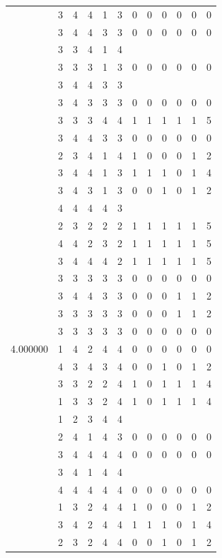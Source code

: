 \documentclass[]{book}
\theoremstyle{definition}
\theoremstyle{definition}
\theoremstyle{definition}
\theoremstyle{remark}
\begin{document}
\begin{table}
{\begin{tabular}[t]{rrrrrrrrrrrr}
 & 3 & 4 & 4 & 1 & 3 & 0 & 0 & 0 & 0 & 0 & 0\\
 & 3 & 4 & 4 & 3 & 3 & 0 & 0 & 0 & 0 & 0 & 0\\
 & 3 & 3 & 4 & 1 & 4 &  &  &  &  &  & \\
 & 3 & 3 & 3 & 1 & 3 & 0 & 0 & 0 & 0 & 0 & 0\\
 & 3 & 4 & 4 & 3 & 3 &  &  &  &  &  & \\
 & 3 & 4 & 3 & 3 & 3 & 0 & 0 & 0 & 0 & 0 & 0\\
 & 3 & 3 & 3 & 4 & 4 & 1 & 1 & 1 & 1 & 1 & 5\\
 & 3 & 4 & 4 & 3 & 3 & 0 & 0 & 0 & 0 & 0 & 0\\
 & 2 & 3 & 4 & 1 & 4 & 1 & 0 & 0 & 0 & 1 & 2\\
 & 3 & 4 & 4 & 1 & 3 & 1 & 1 & 1 & 0 & 1 & 4\\
 & 3 & 4 & 3 & 1 & 3 & 0 & 0 & 1 & 0 & 1 & 2\\
 & 4 & 4 & 4 & 4 & 3 &  &  &  &  &  & \\
 & 2 & 3 & 2 & 2 & 2 & 1 & 1 & 1 & 1 & 1 & 5\\
 & 4 & 4 & 2 & 3 & 2 & 1 & 1 & 1 & 1 & 1 & 5\\
 & 3 & 4 & 4 & 4 & 2 & 1 & 1 & 1 & 1 & 1 & 5\\
 & 3 & 3 & 3 & 3 & 3 & 0 & 0 & 0 & 0 & 0 & 0\\
 & 3 & 4 & 4 & 3 & 3 & 0 & 0 & 0 & 1 & 1 & 2\\
 & 3 & 3 & 3 & 3 & 3 & 0 & 0 & 0 & 1 & 1 & 2\\
 & 3 & 3 & 3 & 3 & 3 & 0 & 0 & 0 & 0 & 0 & 0\\
4.000000 & 1 & 4 & 2 & 4 & 4 & 0 & 0 & 0 & 0 & 0 & 0\\
 & 4 & 3 & 4 & 3 & 4 & 0 & 0 & 1 & 0 & 1 & 2\\
 & 3 & 3 & 2 & 2 & 4 & 1 & 0 & 1 & 1 & 1 & 4\\
 & 1 & 3 & 3 & 2 & 4 & 1 & 0 & 1 & 1 & 1 & 4\\
 & 1 & 2 & 3 & 4 & 4 &  &  &  &  &  & \\
 & 2 & 4 & 1 & 4 & 3 & 0 & 0 & 0 & 0 & 0 & 0\\
 & 3 & 4 & 4 & 4 & 4 & 0 & 0 & 0 & 0 & 0 & 0\\
 & 3 & 4 & 1 & 4 & 4 &  &  &  &  &  & \\
 & 4 & 4 & 4 & 4 & 4 & 0 & 0 & 0 & 0 & 0 & 0\\
 & 1 & 3 & 2 & 4 & 4 & 1 & 0 & 0 & 0 & 1 & 2\\
 & 3 & 4 & 2 & 4 & 4 & 1 & 1 & 1 & 0 & 1 & 4\\
 & 2 & 3 & 2 & 4 & 4 & 0 & 0 & 1 & 0 & 1 & 2\\

\end{tabular}}
\end{table}
\end{document}
